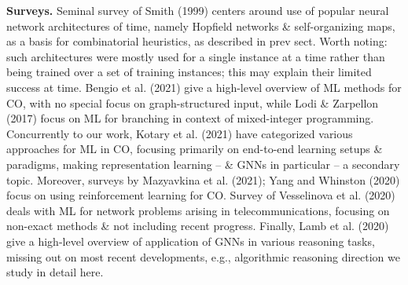 \documentclass{article}
\begin{document}
\begin{itemize}
\begin{itemize}
        {\bf Surveys.} Seminal survey of Smith (1999) centers around use of popular neural network architectures of time, namely Hopfield networks \& self-organizing maps, as a basis for combinatorial heuristics, as described in prev sect. Worth noting: such architectures were mostly used for a single instance at a time rather than being trained over a set of training instances; this may explain their limited success at time. Bengio et al. (2021) give a high-level overview of ML methods for CO, with no special focus on graph-structured input, while Lodi \& Zarpellon (2017) focus on ML for branching in context of mixed-integer programming. Concurrently to our work, Kotary et al. (2021) have categorized various approaches for ML in CO, focusing primarily on end-to-end learning setups \& paradigms, making representation learning -- \& GNNs in particular -- a secondary topic. Moreover, surveys by Mazyavkina et al. (2021); Yang and Whinston (2020) focus on using reinforcement learning for CO. Survey of Vesselinova et al. (2020) deals with ML for network problems arising in telecommunications, focusing on non-exact methods \& not including recent progress. Finally, Lamb et al. (2020) give a high-level overview of application of GNNs in various reasoning tasks, missing out on most recent developments, e.g., algorithmic reasoning direction we study in detail here.


\end{itemize}
\end{itemize}
\end{document}
